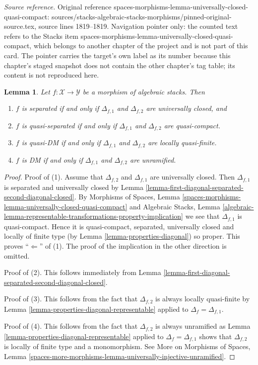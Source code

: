 \documentclass[10pt,a4paper]{amsart}
\theoremstyle{plain}
\newtheorem{lemma}[subsection]{Lemma}
\theoremstyle{definition}
\theoremstyle{remark}
\numberwithin{equation}{subsection}
\begin{document}
\noindent\textit{Source reference.} Original reference spaces-morphisms-lemma-universally-closed-quasi-compact: sources/stacks-algebraic-stacks-morphisms/pinned-original-source.tex, source lines 1819--1819. Navigation pointer only: the counted text refers to the Stacks item spaces-morphisms-lemma-universally-closed-quasi-compact, which belongs to another chapter of the project and is not part of this card. The pointer carries the target's own label as its number because this chapter's staged snapshot does not contain the other chapter's tag table; its content is not reproduced here.\par\medskip
\begin{lemma}
\label{lemma-definition-separated}
Let $f : \mathcal{X} \to \mathcal{Y}$ be a morphism of algebraic stacks.
Then
\begin{enumerate}
\item $f$ is separated if and only if $\Delta_{f, 1}$ and $\Delta_{f, 2}$
are universally closed, and
\item $f$ is quasi-separated if and only if $\Delta_{f, 1}$ and $\Delta_{f, 2}$
are quasi-compact.
\item $f$ is quasi-DM if and only if $\Delta_{f, 1}$ and $\Delta_{f, 2}$
are locally quasi-finite.
\item $f$ is DM if and only if $\Delta_{f, 1}$ and $\Delta_{f, 2}$
are unramified.
\end{enumerate}
\end{lemma}

\begin{proof}
Proof of (1). Assume that $\Delta_{f, 2}$ and $\Delta_{f, 1}$ are
universally closed. Then $\Delta_{f, 1}$ is separated and universally
closed by
Lemma \ref{lemma-first-diagonal-separated-second-diagonal-closed}.
By
Morphisms of Spaces,
Lemma \ref{spaces-morphisms-lemma-universally-closed-quasi-compact}
and
Algebraic Stacks,
Lemma \ref{algebraic-lemma-representable-transformations-property-implication}
we see that $\Delta_{f, 1}$ is quasi-compact.
Hence it is quasi-compact, separated, universally closed and locally of
finite type (by
Lemma \ref{lemma-properties-diagonal})
so proper. This proves ``$\Leftarrow$'' of (1).
The proof of the implication in the other direction is omitted.

\medskip\noindent
Proof of (2). This follows immediately from
Lemma \ref{lemma-first-diagonal-separated-second-diagonal-closed}.

\medskip\noindent
Proof of (3). This follows from the fact that $\Delta_{f, 2}$ is always locally
quasi-finite by
Lemma \ref{lemma-properties-diagonal-representable}
applied to $\Delta_f = \Delta_{f, 1}$.

\medskip\noindent
Proof of (4). This follows from the fact that $\Delta_{f, 2}$ is always
unramified as
Lemma \ref{lemma-properties-diagonal-representable}
applied to $\Delta_f = \Delta_{f, 1}$ shows that
$\Delta_{f, 2}$ is locally of finite type and a monomorphism.
See
More on Morphisms of Spaces,
Lemma \ref{spaces-more-morphisms-lemma-universally-injective-unramified}.
\end{proof}
\end{document}
